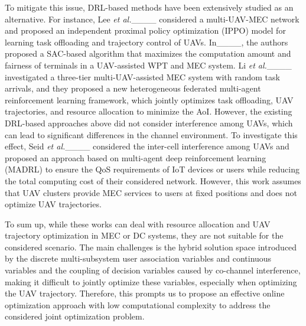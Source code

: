 \par To mitigate this issue, DRL-based methods have been extensively studied as an alternative. For instance, Lee \textit{et al.}____ considered a multi-UAV-MEC network and proposed an independent proximal policy optimization (IPPO) model for learning task offloading and trajectory control of UAVs. In____, the authors proposed a SAC-based algorithm that maximizes the computation amount and fairness of terminals in a UAV-assisted WPT and MEC system. Li \textit{et al.}____ investigated a three-tier multi-UAV-assisted MEC system with random task arrivals, and they proposed a new heterogeneous federated multi-agent reinforcement learning framework, which jointly optimizes task offloading, UAV trajectories, and resource allocation to minimize the AoI. However, the existing DRL-based approaches above did not consider interference among UAVs, which can lead to significant differences in the channel environment. To investigate this effect, Seid \textit{et al.}____ considered the inter-cell interference among UAVs and proposed an approach based on multi-agent deep reinforcement learning (MADRL) to ensure the QoS requirements of IoT devices or users while reducing the total computing cost of their considered network. However, this work assumes that UAV clusters provide MEC services to users at fixed positions and does not optimize UAV trajectories. 

\par To sum up, while these works can deal with resource allocation and UAV trajectory optimization in MEC or DC systems, they are not suitable for the considered scenario. The main challenges is the hybrid solution space introduced by the discrete multi-subsystem user association variables and continuous variables and the coupling of decision variables caused by co-channel interference, making it difficult to jointly optimize these variables, especially when optimizing the UAV trajectory. Therefore, this prompts us to propose an effective online optimization approach with low computational complexity to address the considered joint optimization problem.


